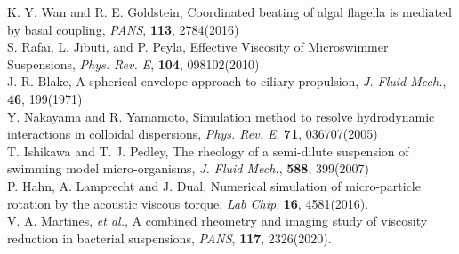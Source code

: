 \documentclass[11pt, a4j, dvipdfmx]{jarticle}
\begin{document}
\renewcommand{\refname}{参考文献}

\begin{thebibliography}{99}
%
K. Y. Wan and R. E. Goldstein, Coordinated beating of algal flagella is mediated by basal coupling, \textit{PANS}, \textbf{113}, 2784(2016)\\

S. Rafa\"i, L. Jibuti, and P. Peyla, Effective Viscosity of Microswimmer Suspensions, \textit{Phys. Rev. E}, \textbf{104}, 098102(2010) \\

%
J. R. Blake, A spherical envelope approach to ciliary propulsion, \textit{J. Fluid Mech.}, \textbf{46}, 199(1971) \\

%
Y. Nakayama and R. Yamamoto, Simulation method to resolve hydrodynamic interactions in colloidal dispersions, \textit{Phys. Rev. E}, \textbf{71}, 036707(2005)\\

%
T. Ishikawa and T. J. Pedley, The rheology of a semi-dilute suspension of swimming model micro-organisms, \textit{J. Fluid Mech.}, \textbf{588}, 399(2007) \\

%
P. Hahn, A. Lamprecht and J. Dual, Numerical simulation of micro-particle rotation by the acoustic viscous torque, \textit{Lab Chip}, \textbf{16}, 4581(2016). \\

%
V. A. Martines, \textit{et al.}, A combined rheometry and imaging study of viscosity reduction in bacterial suspensions, \textit{PANS}, \textbf{117}, 2326(2020). 
\vspace{-8truemm}\\
\end{thebibliography}
\end{document}
